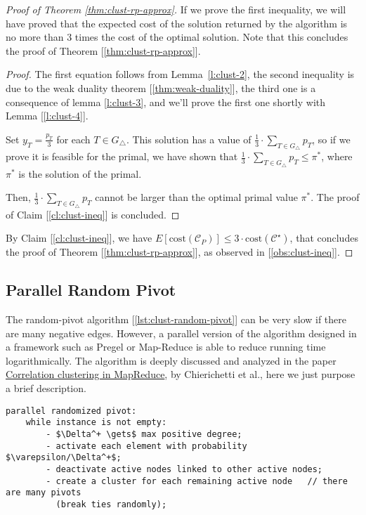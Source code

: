\begin{proof}[Proof of Theorem \ref{thm:clust-rp-approx}]
    \obs\label{obs:clust-ineq} If we prove the first inequality, we will have proved that the expected cost of the solution returned by the algorithm is no more than 3 times the cost of the optimal solution. Note that this concludes the proof of Theorem [\ref{thm:clust-rp-approx}].
    
    \begin{proof}
        The first equation follows from Lemma~\ref{l:clust-2}, the second inequality is due to the weak duality theorem [\ref{thm:weak-duality}], the third one is a consequence of lemma \ref{l:clust-3}, and we'll prove the first one shortly with Lemma [\ref{l:clust-4}].
    
        
        Set $y_T = \frac{p_T}{3}$ for each $T \in G_\triangle$. This solution has a value of $\frac13 \cdot \sum_{T \in G_\triangle} p_T$, so if we prove it is feasible for the primal, we have shown that $\frac13 \cdot \sum_{T \in G_\triangle} p_T \le \pi^{*}$, where $\pi^{*}$ is the solution of the primal.
    
        
        Then, $\frac13 \cdot \sum_{T \in G_\triangle} p_T$ cannot be larger than the optimal primal value $\pi^*$. The proof of Claim [\ref{cl:clust-ineq}] is concluded.
    \end{proof}
    
    By Claim [\ref{cl:clust-ineq}], we have
    $E[\text{cost}(\mathscr{C}_P)] \le 3 \cdot \text{cost}(\mathscr{C}^{\star})$, that concludes the proof of Theorem [\ref{thm:clust-rp-approx}], as observed in [\ref{obs:clust-ineq}].
\end{proof}    


\subsection{Parallel Random Pivot}

\obs The random-pivot algorithm [\ref{lst:clust-random-pivot}] can be very slow if there are many negative edges. However, a parallel version of the algorithm designed in a framework such as Pregel or Map-Reduce is able to reduce running time logarithmically. The algorithm is deeply discussed and analyzed in the paper \href{https://dl.acm.org/citation.cfm?id=2623743}{Correlation clustering in MapReduce}, by Chierichetti et al., here we just purpose a brief description.

\begin{lstlisting}[caption={Parallel Randomized Pivot}, label={lst:parallel-random-pivot}]
parallel randomized pivot:
    while instance is not empty:
        - $\Delta^+ \gets$ max positive degree;
        - activate each element with probability $\varepsilon/\Delta^+$;
        - deactivate active nodes linked to other active nodes;
        - create a cluster for each remaining active node   // there are many pivots
          (break ties randomly);
\end{lstlisting}

